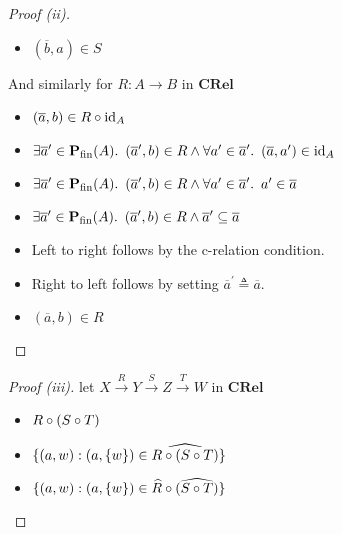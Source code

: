 \begin{prop}
\begin{proof}[Proof (ii)]
\begin{itemize}
      \item[\iffs]
        $(\overline{b},a)\in S$
    \end{itemize}

    And similarly for $R : A\to B$ in $\mathbf{CRel}$

    \begin{itemize}
      \item[\phantom{\imps}]
        $(\overline{a}, b)\in R\circ \operatorname{id}_A$

      \item[\iffs]
        $\exists\overline{a}^\prime\in\mathbf{P}_{\operatorname{fin}}(A)\ldotp~(\overline{a}^\prime,b)\in R\land\forall a^\prime\in\overline{a}^\prime\ldotp~(\overline{a}, a^\prime)\in\operatorname{id}_A$

      \item[\iffs]
        $\exists\overline{a}^\prime\in\mathbf{P}_{\operatorname{fin}}(A)\ldotp~(\overline{a}^\prime,b)\in R\land\forall a^\prime\in\overline{a}^\prime\ldotp~a^\prime\in\overline{a}$

      \item[\iffs]
        $\exists\overline{a}^\prime\in\mathbf{P}_{\operatorname{fin}}(A)\ldotp~(\overline{a}^\prime,b)\in R\land\overline{a}^\prime\subseteq\overline{a}$

      \item[\phantom{\imps}]
        Left to right follows by the c-relation condition.

      \item[\phantom{\imps}]
        Right to left follows by setting $\overline{a}^\prime\triangleq\overline{a}$.

      \item[\iffs]
        $(\overline{a}, b)\in R$\qedhere
    \end{itemize}
  \end{proof}

  \begin{proof}[Proof (iii)]
    let $X\overset{R}\longrightarrow Y\overset{S}\longrightarrow Z\overset{T}\longrightarrow W$ in $\mathbf{CRel}$

    \begin{itemize}
      \item[\phs]
        $R\circ(S\circ T)$

      \item[\eqs]
        $\{(a,w):(a,\{w\})\in\widehat{R\circ(S\circ T)}\}$
        \marginnote{\Thm-\ref{prop:rel-rel-hat}}

      \item[\eqs]
        $\{(a,w):(a,\{w\})\in\widehat{R}\circ(\widehat{S\circ T})\}$
        \marginnote{\Thm-\ref{prop:rel-hat-comp}}


\end{itemize}
\end{proof}
\end{prop}
